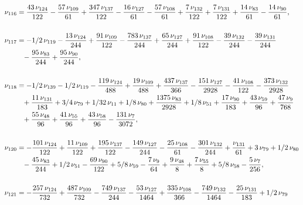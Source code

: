 \documentclass[a4paper,12pt, DIV=14, BCOR=5mm, twoside, headsepline]{scrbook}
\begin{document}
\begin{align}\label{AreaSol11}
\begin{aligned}
\nu_{{116}}&={\frac {43\,\nu
_{{124}}}{122}}-{\frac {57\,\nu_{{109}}}{61}}+{\frac {347\,\nu_{{137}}
}{122}}-{\frac {16\,\nu_{{127}}}{61}}-{\frac {57\,\nu_{{108}}}{61}}+{
\frac {7\,\nu_{{132}}}{122}}+{\frac {7\,\nu_{{131}}}{122}}+{\frac {14
\,\nu_{{83}}}{61}}-{\frac {14\,\nu_{{90}}}{61}}, \\
\\
\nu_{{117}}&=-1/2\,\nu_
{{119}}-{\frac {13\,\nu_{{124}}}{244}}+{\frac {91\,\nu_{{109}}}{122}}-
{\frac {783\,\nu_{{137}}}{244}}+{\frac {65\,\nu_{{127}}}{244}}+{\frac 
{91\,\nu_{{108}}}{122}}-{\frac {39\,\nu_{{132}}}{244}}-{\frac {39\,\nu
_{{131}}}{244}}\\
 &\hphantom{=}-{\frac {95\,\nu_{{83}}}{244}}+{\frac {95\,\nu_{{90}}}{
244}}, \\
\\
\nu_{{118}}&=-1/2\,\nu_{{139}}-1/2\,\nu_{{119}}-{\frac {119\,\nu_
{{124}}}{488}}+{\frac {19\,\nu_{{109}}}{488}}+{\frac {437\,\nu_{{137}}
}{366}}-{\frac {151\,\nu_{{127}}}{2928}}-{\frac {41\,\nu_{{108}}}{122}
}-{\frac {373\,\nu_{{132}}}{2928}}\\
 &\hphantom{=}+{\frac {11\,\nu_{{131}}}{183}}+3/4
\,\nu_{{79}}+1/32\,\nu_{{11}}+1/8\,\nu_{{80}}+{\frac {1375\,\nu_{{83}}
}{2928}}+1/8\,\nu_{{51}}+{\frac {17\,\nu_{{90}}}{183}}+{\frac {43\,\nu
_{{59}}}{96}}+{\frac {47\,\nu_{{9}}}{768}}\\
 &\hphantom{=}+{\frac {55\,\nu_{{48}}}{96}
}+{\frac {41\,\nu_{{55}}}{96}}+{\frac {43\,\nu_{{58}}}{96}}-{\frac {
131\,\nu_{{7}}}{3072}}, \\
\\
\nu_{{120}}&=-{\frac {101\,\nu_{{124}}}{122}}+{
\frac {11\,\nu_{{109}}}{122}}+{\frac {195\,\nu_{{137}}}{122}}-{\frac {
149\,\nu_{{127}}}{244}}-{\frac {25\,\nu_{{108}}}{61}}-{\frac {301\,\nu
_{{132}}}{244}}+{\frac {\nu_{{131}}}{61}}+3\,\nu_{{79}}+1/2\,\nu_{{80}
}\\
 &\hphantom{=}-{\frac {45\,\nu_{{83}}}{244}}+1/2\,\nu_{{51}}-{\frac {69\,\nu_{{90}}
}{122}}+5/8\,\nu_{{59}}-{\frac {7\,\nu_{{9}}}{64}}+{\frac {9\,\nu_{{48
}}}{8}}+{\frac {7\,\nu_{{55}}}{8}}+5/8\,\nu_{{58}}-{\frac {5\,\nu_{{7}
}}{256}}, \\
\\
\nu_{{121}}&=-{\frac {257\,\nu_{{124}}}{732}}+{\frac {487\,\nu
_{{109}}}{732}}-{\frac {749\,\nu_{{137}}}{244}}-{\frac {53\,\nu_{{127}
}}{1464}}+{\frac {335\,\nu_{{108}}}{366}}-{\frac {749\,\nu_{{132}}}{
1464}}-{\frac {25\,\nu_{{131}}}{183}}+1/2\,\nu_{{79}}\\

\end{aligned}
\end{align}
\end{document}
